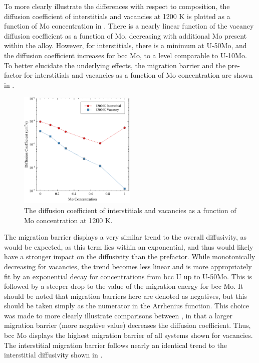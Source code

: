 \documentclass[review]{elsarticle}
\begin{document}
To more clearly illustrate the differences with respect to composition, the diffusion coefficient of interstitials and vacancies at 1200 K is plotted as a function of Mo concentration in . There is a nearly linear function of the vacancy diffusion coefficient as a function of Mo, decreasing with additional Mo present within the alloy. However, for interstitials, there is a minimum at U-50Mo, and the diffusion coefficient increases for bcc Mo, to a level comparable to U-10Mo. To better elucidate the underlying effects, the migration barrier and the pre-factor for interstitials and vacancies as a function of Mo concentration are shown in . 

\begin{figure}[h]
    \centering
    \includegraphics[width=0.5\textwidth]{1200K_diff.pdf}
    \caption{The diffusion coefficient of interstitials and vacancies as a function of Mo concentration at 1200 K.}
    \label{fig:1200K_diff}
\end{figure}

The migration barrier displays a very similar trend to the overall diffusivity, as would be expected, as this term lies within an exponential, and thus would likely have a stronger impact on the diffusivity than the prefactor. While monotonically decreasing for vacancies, the trend becomes less linear and is more appropriately fit by an exponential decay for concentrations from bcc U up to U-50Mo. This is followed by a steeper drop to the value of the migration energy for bcc Mo. It should be noted that migration barriers here are denoted as negatives, but this should be taken simply as the numerator in the Arrhenius function. This choice was made to more clearly illustrate comparisons between , in that a larger migration barrier (more negative value) decreases the diffusion coefficient. Thus, bcc Mo displays the highest migration barrier of all systems shown for vacancies. The interstitial migration barrier follows nearly an identical trend to the interstitial diffusivity shown in . 
\end{document}

